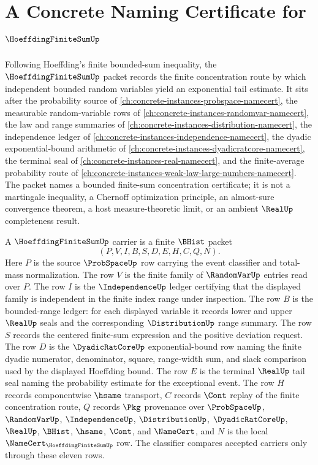 \chapter{A Concrete Naming Certificate for $\HoeffdingFiniteSumUp$}
\label{ch:concrete-instances-hoeffding-finite-sum-namecert}

Following Hoeffding's finite bounded-sum inequality, the $\HoeffdingFiniteSumUp$ packet records the finite concentration route by which independent bounded random variables yield an exponential tail estimate. It sits after the probability source of \autoref{ch:concrete-instances-probspace-namecert}, the measurable random-variable rows of \autoref{ch:concrete-instances-randomvar-namecert}, the law and range summaries of \autoref{ch:concrete-instances-distribution-namecert}, the independence ledger of \autoref{ch:concrete-instances-independence-namecert}, the dyadic exponential-bound arithmetic of \autoref{ch:concrete-instances-dyadicratcore-namecert}, the terminal seal of \autoref{ch:concrete-instances-real-namecert}, and the finite-average probability route of \autoref{ch:concrete-instances-weak-law-large-numbers-namecert}. The packet names a bounded finite-sum concentration certificate; it is not a martingale inequality, a Chernoff optimization principle, an almost-sure convergence theorem, a host measure-theoretic limit, or an ambient $\RealUp$ completeness result.

\begin{definition}\label{def:hoeffding-finite-sum-carrier}
A $\HoeffdingFiniteSumUp$ carrier is a finite $\BHist$ packet
$$
(P,V,I,B,S,D,E,H,C,Q,N).
$$
Here $P$ is the source $\ProbSpaceUp$ row carrying the event classifier and total-mass normalization. The row $V$ is the finite family of $\RandomVarUp$ entries read over $P$. The row $I$ is the $\IndependenceUp$ ledger certifying that the displayed family is independent in the finite index range under inspection. The row $B$ is the bounded-range ledger: for each displayed variable it records lower and upper $\RealUp$ seals and the corresponding $\DistributionUp$ range summary. The row $S$ records the centered finite-sum expression and the positive deviation request. The row $D$ is the $\DyadicRatCoreUp$ exponential-bound row naming the finite dyadic numerator, denominator, square, range-width sum, and slack comparison used by the displayed Hoeffding bound. The row $E$ is the terminal $\RealUp$ tail seal naming the probability estimate for the exceptional event. The row $H$ records componentwise $\hsame$ transport, $C$ records $\Cont$ replay of the finite concentration route, $Q$ records $\Pkg$ provenance over $\ProbSpaceUp$, $\RandomVarUp$, $\IndependenceUp$, $\DistributionUp$, $\DyadicRatCoreUp$, $\RealUp$, $\BHist$, $\hsame$, $\Cont$, and $\NameCert$, and $N$ is the local $\NameCert_{\HoeffdingFiniteSumUp}$ row. The classifier compares accepted carriers only through these eleven rows.
\end{definition}

